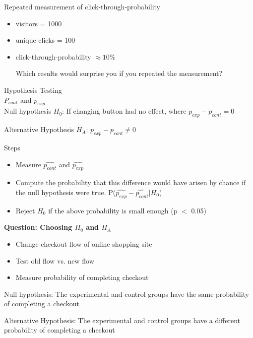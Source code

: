 \documentclass[10pt]{article}
\theoremstyle{definition}
\begin{document}
Repeated measurement of click-through-probability
\begin{itemize}
    \item visitors = 1000
    \item unique clicks = 100
    \item click-through-probability $\approx 10\%$
    
    Which results would surprise you if you repeated the measurement?
\end{itemize}
Hypothesis Testing \\
$P_{cont}$ and $p_{exp}$ \\
Null hypothesis $H_{0}$: If changing button had no effect, where $p_{exp} - p_{cont} = 0$

Alternative Hypothesis $H_{A}$: $p_{exp} - p_{cont} \neq 0$

Steps
\begin{itemize}
\item Measure $\hat{p_{cont}}$ and $\hat{p_{exp}}$
\item Compute the probability that this difference would have arisen by chance if the null hypothesis were true. P($\hat{p_{exp}} - \hat{p_{cont}}|H_{0}$)
\item Reject $H_{0}$ if the above probability is small enough (p $<$ 0.05)
\end{itemize}

\textbf{Question: Choosing $H_{0}$ and $H_{A}$}
\begin{itemize}
    \item Change checkout flow of online shopping site
    \item Test old flow vs. new flow
    \item Measure probability of completing checkout
\end{itemize}
Null hypothesis: The experimental and control groups have the same probability of completing a checkout

Alternative Hypothesis: The experimental and control groups have a different probability of completing a checkout
\end{document}
